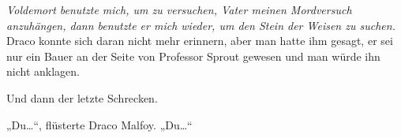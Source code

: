 \emph{Voldemort benutzte mich, um zu versuchen, Vater meinen Mordversuch anzuhängen, dann benutzte er mich wieder, um den Stein der Weisen zu suchen.}
Draco konnte sich daran nicht mehr erinnern, aber man hatte ihm gesagt, er sei nur ein Bauer an der Seite von Professor Sprout gewesen und man würde ihn nicht anklagen.

Und dann der letzte Schrecken.

„Du…“, flüsterte Draco Malfoy. „Du…“

